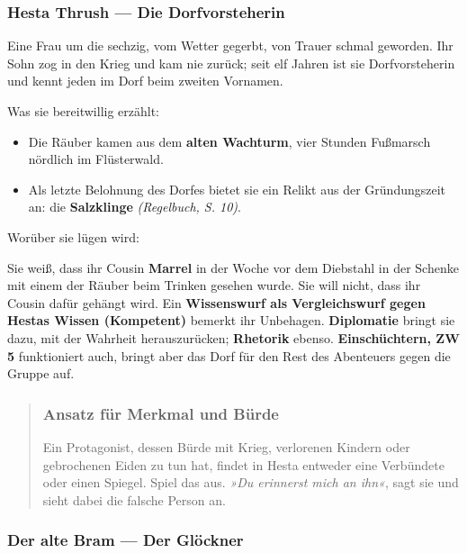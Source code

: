 \documentclass[10pt,a4paper]{article}
\newcommand{\tightlist}{\setlength{\itemsep}{0pt}\setlength{\parskip}{0pt}}
\begin{document}
\subsubsection{Hesta Thrush --- Die Dorfvorsteherin}\label{hesta-thrush-die-dorfvorsteherin}

Eine Frau um die sechzig, vom Wetter gegerbt, von Trauer schmal geworden. Ihr Sohn zog in den Krieg und kam nie zurück; seit elf Jahren ist sie Dorfvorsteherin und kennt jeden im Dorf beim zweiten Vornamen.

Was sie bereitwillig erzählt:

\begin{itemize}
\tightlist
\item
  Die Räuber kamen aus dem \textbf{alten Wachturm}, vier Stunden Fußmarsch nördlich im Flüsterwald.
\item
  Als letzte Belohnung des Dorfes bietet sie ein Relikt aus der Gründungszeit an: die \textbf{Salzklinge} \emph{(Regelbuch, S. 10)}.
\end{itemize}

Worüber sie lügen wird:

Sie weiß, dass ihr Cousin \textbf{Marrel} in der Woche vor dem Diebstahl in der Schenke mit einem der Räuber beim Trinken gesehen wurde. Sie will nicht, dass ihr Cousin dafür gehängt wird. Ein \textbf{Wissenswurf als Vergleichswurf gegen Hestas Wissen (Kompetent)} bemerkt ihr Unbehagen. \textbf{Diplomatie} bringt sie dazu, mit der Wahrheit herauszurücken; \textbf{Rhetorik} ebenso. \textbf{Einschüchtern, ZW 5} funktioniert auch, bringt aber das Dorf für den Rest des Abenteuers gegen die Gruppe auf.

\begin{quote}
\subsubsection{Ansatz für Merkmal und Bürde}\label{ansatz-fuxfcr-wesenszug-und-buxfcrde}

Ein Protagonist, dessen Bürde mit Krieg, verlorenen Kindern oder gebrochenen Eiden zu tun hat, findet in Hesta entweder eine Verbündete oder einen Spiegel. Spiel das aus. \emph{»Du erinnerst mich an ihn«}, sagt sie und sieht dabei die falsche Person an.
\end{quote}

\subsubsection{Der alte Bram --- Der Glöckner}\label{der-alte-bram-der-gluxf6ckner}
\end{document}
